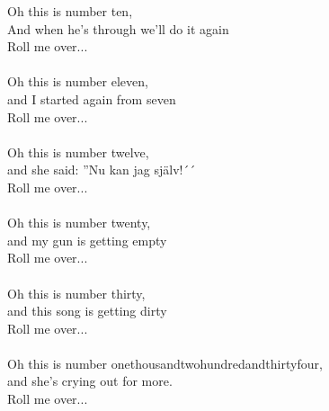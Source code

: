 Oh this is number ten,\\
And when he's through we'll do it again\\
Roll me over...\\
\\
Oh this is number eleven,\\
and I started again from seven\\
Roll me over...\\
\\
Oh this is number twelve,\\
and she said: ''Nu kan jag själv!´´\\
Roll me over...\\
\\
Oh this is number twenty,\\
and my gun is getting empty\\
Roll me over...\\
\\
Oh this is number thirty,\\
and this song is getting dirty\\
Roll me over...\\
\\
Oh this is number onethousandtwohundredandthirtyfour,\\
and she's crying out for more.\\
Roll me over...

